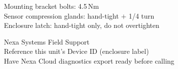 \documentclass[11pt,a4paper,oneside,headings=big,chapterprefix=true]{scrreprt}
\begin{document}
\par\vspace{0.5cm}

\noindent
\begin{minipage}[t]{0.48\textwidth}
\begin{tcolorbox}[colback=steel!6,colframe=steel,title=\textcolor{white}{\bfseries\faTools\ \ Torque Values},fonttitle=\bfseries,arc=1.5pt]
\small
Mounting bracket bolts: 4.5\,N\textperiodcentered m\\
Sensor compression glands: hand-tight $+$ 1/4 turn\\
Enclosure latch: hand-tight only, do not overtighten
\end{tcolorbox}
\end{minipage}\hfill
\begin{minipage}[t]{0.48\textwidth}
\begin{tcolorbox}[colback=amberaccent!8,colframe=amberaccent,title=\bfseries\faPhone\ \ Support,fonttitle=\bfseries,arc=1.5pt]
\small
Nexa Systems Field Support\\
Reference this unit's Device ID (enclosure label)\\
Have Nexa Cloud diagnostics export ready before calling
\end{tcolorbox}
\end{minipage}
\end{document}
